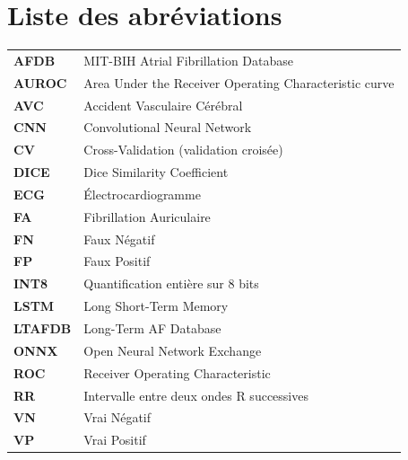 \chapter*{Liste des abréviations}

\begin{tabular}{ll}
  \textbf{AFDB}   & MIT-BIH Atrial Fibrillation Database \\
  \textbf{AUROC}  & Area Under the Receiver Operating Characteristic curve \\
  \textbf{AVC}    & Accident Vasculaire Cérébral \\
  \textbf{CNN}    & Convolutional Neural Network \\
  \textbf{CV}     & Cross-Validation (validation croisée) \\
  \textbf{DICE}   & Dice Similarity Coefficient \\
  \textbf{ECG}    & Électrocardiogramme \\
  \textbf{FA}     & Fibrillation Auriculaire \\
  \textbf{FN}     & Faux Négatif \\
  \textbf{FP}     & Faux Positif \\
  \textbf{INT8}   & Quantification entière sur 8 bits \\
  \textbf{LSTM}   & Long Short-Term Memory \\
  \textbf{LTAFDB} & Long-Term AF Database \\
  \textbf{ONNX}   & Open Neural Network Exchange \\
  \textbf{ROC}    & Receiver Operating Characteristic \\
  \textbf{RR}     & Intervalle entre deux ondes R successives \\
  \textbf{VN}     & Vrai Négatif \\
  \textbf{VP}     & Vrai Positif \\
\end{tabular}
